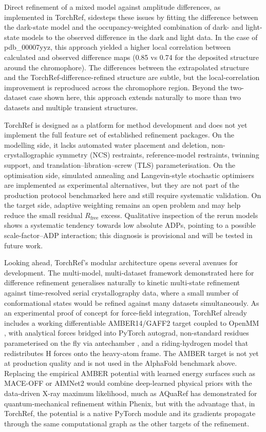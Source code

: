 \documentclass{iucrjournals}
\begin{document}
Direct refinement of a mixed model against amplitude differences, as
implemented in TorchRef, sidesteps these issues by fitting the difference
between the dark-state model and the occupancy-weighted combination of dark- and
light-state models to the observed difference in the dark and light data.
In the case of pdb\_00007yyz, this approach yielded a higher local correlation between
calculated and observed difference maps (0.85 vs 0.74 for the deposited
structure around the chromophore).
The differences between the extrapolated structure and the
TorchRef-difference-refined structure are subtle, but the local-correlation
improvement is reproduced across the chromophore region.
Beyond the two-dataset case shown here, this approach extends naturally to
more than two datasets and multiple transient structures.

TorchRef is designed as a platform for method development and does not yet
implement the full feature set of established refinement packages.  On the
modelling side, it lacks automated water placement and deletion,
non-crystallographic symmetry (NCS) restraints, reference-model restraints,
twinning support, and translation--libration--screw (TLS) parameterisation.  On
the optimisation
side, simulated annealing and Langevin-style stochastic optimisers are implemented
as experimental alternatives, but they are not part of the production protocol
benchmarked here and still require systematic validation. On the target side,
adaptive weighting remains an open problem and may help reduce the small
residual $R_\mathrm{free}$ excess. Qualitative inspection of the rerun models
shows a systematic tendency towards low absolute ADPs, pointing to a possible
scale-factor--ADP interaction; this diagnosis is provisional and will be tested
in future work.

Looking ahead, TorchRef's modular architecture opens several avenues for
development.
The multi-model, multi-dataset framework demonstrated here for difference
refinement generalises naturally to kinetic multi-state refinement against
time-resolved serial crystallography data, where a small number of
conformational states would be refined against many datasets simultaneously.
As an experimental proof of concept for force-field integration, TorchRef
already includes a working differentiable AMBER14/GAFF2 target
\cite{maier_ff14sb_2015,wang_gaff_2004} coupled to OpenMM
\cite{eastman_openmm_2017}, with analytical forces bridged into PyTorch
autograd, non-standard residues parameterised on the fly via antechamber
\cite{wang_antechamber_2006}, and a riding-hydrogen model that redistributes H
forces onto the heavy-atom frame. The AMBER target is not yet at production
quality and is not used in the AlphaFold benchmark above.
Replacing the empirical AMBER potential with learned energy surfaces such as
MACE-OFF \cite{kovacs_mace-off_2025} or AIMNet2 \cite{anstine_aimnet2_2025}
would combine deep-learned physical priors with the data-driven X-ray maximum
likelihood, much as AQuaRef \cite{zubatyuk_aquaref_2025} has demonstrated for
quantum-mechanical refinement within Phenix, but with the advantage that, in
TorchRef, the potential is a native PyTorch module and its gradients propagate
through the same computational graph as the other targets of the refinement.
\end{document}
